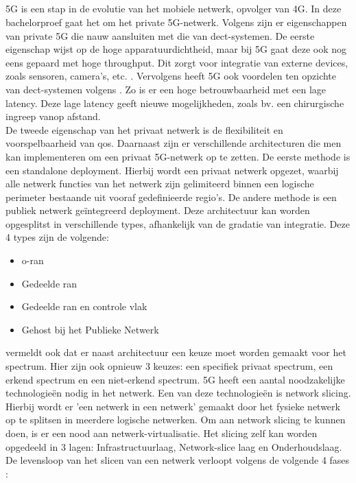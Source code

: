 \subsection{}%
\label{sec:5g}%
5G is een stap in de evolutie van het mobiele netwerk, opvolger van 4G. In deze bachelorproef gaat het om het private 5G-netwerk. Volgens \textcite{wen2021private} zijn er eigenschappen van private 5G die nauw aansluiten met die van \gls{dect}-systemen. De eerste eigenschap wijst op de hoge apparatuurdichtheid, maar bij 5G gaat deze ook nog eens gepaard met hoge throughput. Dit zorgt voor integratie van externe devices, zoals sensoren, camera's, etc. . Vervolgens heeft 5G ook voordelen ten opzichte van \gls{dect}-systemen volgens \textcite{wen2021private}. Zo is er een hoge betrouwbaarheid met een lage latency. Deze lage latency geeft nieuwe mogelijkheden, zoals bv. een chirurgische ingreep vanop afstand.\\ De tweede eigenschap van het privaat netwerk is de flexibiliteit en voorspelbaarheid van \gls{qos}. Daarnaast zijn er verschillende architecturen die men kan implementeren om een privaat 5G-netwerk op te zetten. De eerste methode is een standalone deployment. Hierbij wordt een privaat netwerk opgezet, waarbij alle netwerk functies van het netwerk zijn gelimiteerd binnen een logische perimeter bestaande uit vooraf gedefinieerde regio's. De andere methode is een publiek netwerk geïntegreerd deployment. Deze architectuur kan worden opgesplitst in verschillende types, afhankelijk van de gradatie van integratie. Deze 4 types zijn de volgende:

\begin{itemize}
  \item \gls{o-ran}
  \item Gedeelde \gls{ran}
  \item Gedeelde \gls{ran} en controle vlak
  \item Gehost bij het Publieke Netwerk
\end{itemize}

\textcite{wen2021private} vermeldt ook dat er naast architectuur een keuze moet worden gemaakt voor het spectrum. Hier zijn ook opnieuw 3 keuzes: een specifiek privaat spectrum, een erkend spectrum en een niet-erkend spectrum. 
5G heeft een aantal noodzakelijke technologieën nodig in het netwerk. Een van deze technologieën is network slicing. Hierbij wordt er 'een netwerk in een netwerk' gemaakt door het fysieke netwerk op te splitsen in meerdere logische netwerken. Om aan network slicing te kunnen doen, is er een nood aan netwerk-virtualisatie. Het slicing zelf kan worden opgedeeld in 3 lagen: Infrastructuurlaag, Network-slice laag en Onderhoudslaag. De levensloop van het slicen van een netwerk verloopt volgens de volgende 4 fases \autocite{wen2021private}:

